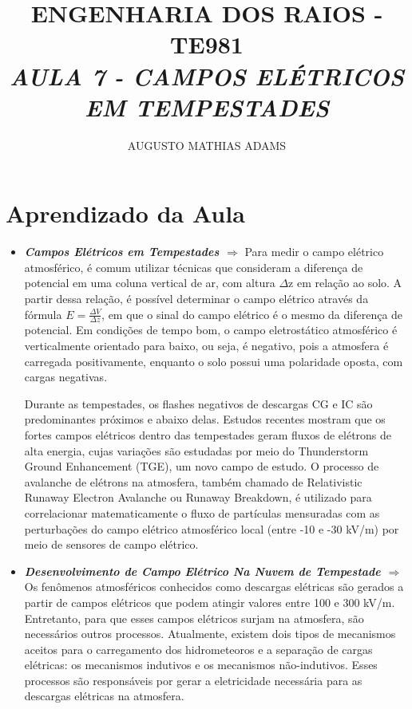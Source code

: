 \documentclass[a4paper, 12pt, onecolumn,singlespacing]{article}
\title{\normalsize{ENGENHARIA DOS RAIOS - TE981}\\ \huge{\textbf\textit{{AULA 7 - CAMPOS ELÉTRICOS EM TEMPESTADES}}\\}}
\author{\small{AUGUSTO MATHIAS ADAMS}}
\begin{document}
	
	\maketitle
	
	\section{Aprendizado da Aula}
	
	\begin{itemize}
		
		\item \textbf{\textit{Campos Elétricos em Tempestades $\Rightarrow$ }}Para medir o campo elétrico atmosférico, é comum utilizar técnicas que consideram a diferença de potencial em uma coluna vertical de ar, com altura $\Delta$z em relação ao solo. A partir dessa relação, é possível determinar o campo elétrico através da fórmula $E = \frac{\Delta V}{\Delta z}$, em que o sinal do campo elétrico é o mesmo da diferença de potencial. Em condições de tempo bom, o campo eletrostático atmosférico é verticalmente orientado para baixo, ou seja, é negativo, pois a atmosfera é carregada positivamente, enquanto o solo possui uma polaridade oposta, com cargas negativas.
		
		Durante as tempestades, os flashes negativos de descargas CG e IC são predominantes próximos e abaixo delas. Estudos recentes mostram que os fortes campos elétricos dentro das tempestades geram fluxos de elétrons de alta energia, cujas variações são estudadas por meio do Thunderstorm Ground Enhancement (TGE), um novo campo de estudo. O processo de avalanche de elétrons na atmosfera, também chamado de Relativistic Runaway Electron Avalanche ou Runaway Breakdown, é utilizado para correlacionar matematicamente o fluxo de partículas mensuradas com as perturbações do campo elétrico atmosférico local (entre -10 e -30 kV/m) por meio de sensores de campo elétrico.
		
		\item \textbf{\textit{Desenvolvimento de Campo Elétrico Na Nuvem de Tempestade $\Rightarrow$ }} Os fenômenos atmosféricos conhecidos como descargas elétricas são gerados a partir de campos elétricos que podem atingir valores entre 100 e 300 kV/m. Entretanto, para que esses campos elétricos surjam na atmosfera, são necessários outros processos. Atualmente, existem dois tipos de mecanismos aceitos para o carregamento dos hidrometeoros e a separação de cargas elétricas: os mecanismos indutivos e os mecanismos não-indutivos. Esses processos são responsáveis por gerar a eletricidade necessária para as descargas elétricas na atmosfera.
		

\end{itemize}
\end{document}
